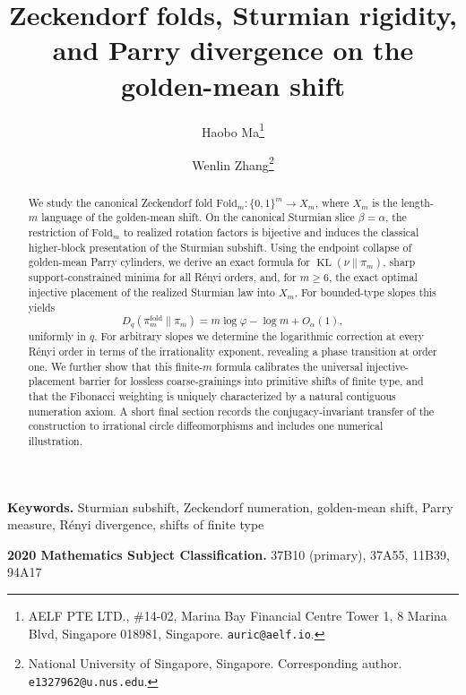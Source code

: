 \documentclass[11pt,a4paper]{article}
\title{Zeckendorf folds, Sturmian rigidity, and Parry divergence on the golden-mean shift}
\author{Haobo Ma\thanks{AELF PTE LTD., \#14-02, Marina Bay Financial Centre Tower 1, 8 Marina Blvd, Singapore 018981, Singapore. \texttt{auric@aelf.io}.}
\and
Wenlin Zhang\thanks{National University of Singapore, Singapore. Corresponding author. \texttt{e1327962@u.nus.edu}.}}
\date{}
\numberwithin{equation}{section}
\theoremstyle{plain}
\theoremstyle{definition}
\theoremstyle{remark}
\newcommand{\Fold}{\mathrm{Fold}}
\DeclareMathOperator{\KL}{KL}
\begin{document}
\maketitle

\begin{abstract}
We study the canonical Zeckendorf fold $\Fold_m:\{0,1\}^m\to X_m$, where
$X_m$ is the length-$m$ language of the golden-mean shift. On the canonical
Sturmian slice $\beta=\alpha$, the restriction of $\Fold_m$ to realized
rotation factors is bijective and induces the classical higher-block
presentation of the Sturmian subshift. Using the endpoint collapse of
golden-mean Parry cylinders, we derive an exact formula for
$\KL(\nu\|\pi_m)$, sharp support-constrained minima for all R\'enyi orders,
and, for $m\ge 6$, the exact optimal injective placement of the realized
Sturmian law into $X_m$. For bounded-type slopes this yields
$$
D_q(\pi_m^{\mathrm{fold}}\|\pi_m)
=m\log\varphi-\log m+O_\alpha(1),
$$
uniformly in $q$. For arbitrary slopes we determine the logarithmic correction
at every R\'enyi order in terms of the irrationality exponent, revealing a
phase transition at order one. We further show that this finite-\(m\) formula
calibrates
the universal injective-placement barrier for lossless coarse-grainings into
primitive shifts of finite type, and that the Fibonacci weighting is uniquely
characterized by a natural contiguous numeration axiom. A short final section
records the conjugacy-invariant transfer of the construction to irrational
circle diffeomorphisms and includes one numerical illustration.
\end{abstract}

\medskip
\noindent\textbf{Keywords.} Sturmian subshift, Zeckendorf numeration,
golden-mean shift, Parry measure, R\'enyi divergence, shifts of finite type

\medskip
\noindent\textbf{2020 Mathematics Subject Classification.}
37B10 (primary), 37A55, 11B39, 94A17











\appendix






\end{document}
